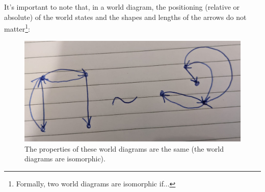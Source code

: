 It's important to note that, in a world diagram, the positioning (relative or absolute) of the world states and the shapes and lengths of the arrows do not matter\footnote{Formally, two world diagrams are isomorphic if...}:
\begin{figure}
	\centering
	\includegraphics[width=0.5\linewidth]{2MathematicalFramework/Images/isomorphic_world_diagrams.jpeg}
	\caption{The properties of these world diagrams are the same (the world diagrams are isomorphic).}
	\label{fig:isomorphic_world_diagrams}
\end{figure}

